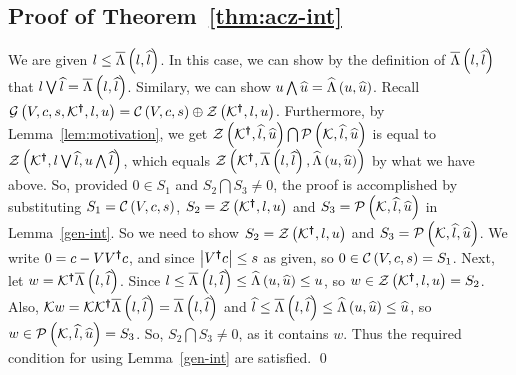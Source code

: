 \subsection*{Proof of Theorem~\ref{thm:acz-int}}
We are given $l\leq \overline{\Lambda}\left(l,\widehat{l}\right)$.  In this case, we can show
by the definition of $\overline{\Lambda}\left(l,\widehat{l}\right)$ that
$l\bigvee\widehat{l}=\overline{\Lambda}\left(l,\widehat{l}\right)$. Similary, we can show
$u\bigwedge \widehat{u}=\widehat{\Lambda}\left(u,\widehat{u}\right)$.  Recall
$\mathcal{G}\left(V,c,s,\mathcal{K}^{\bm{\dagger}},l,u\right)=\mathcal{C}\left(V,c,s\right)\oplus\mathcal{Z}\left(\mathcal{K}^{\bm{\dagger}},l,u\right)$.
Furthermore, by Lemma~\ref{lem:motivation}, we get
$\mathcal{Z}\left(\mathcal{K}^{\bm{\dagger}},\widehat{l},\widehat{u}\right)\bigcap\mathcal{P}\left(\mathcal{K},\widehat{l},\widehat{u}\right)$
is equal to
$\mathcal{Z}\left(\mathcal{K}^{\bm{\dagger}},l\bigvee\widehat{l},u\bigwedge{\widehat{l}}\right)$, which
equals
$\mathcal{Z}\left(\mathcal{K}^{\bm{\dagger}},\overline{\Lambda}\left(l,\widehat{l}\right),\widehat{\Lambda}\left(u,\widehat{u}\right)\right)$
by what we have above.  So, provided $0\in S_1$ and $S_2\bigcap
S_3\neq 0$, the proof is accomplished by substituting
$S_1=\mathcal{C}\left(V,c,s\right)$, $S_2=\mathcal{Z}\left(\mathcal{K}^{\bm{\dagger}},l,u\right)$ and
$S_3=\mathcal{P}\left(\mathcal{K},\widehat{l},\widehat{u}\right)$ in Lemma~\ref{gen-int}.  So
we need to show $S_2=\mathcal{Z}\left(\mathcal{K}^{\bm{\dagger}},l,u\right)$ and
$S_3=\mathcal{P}\left(\mathcal{K},\widehat{l},\widehat{u}\right)$.  We write $0 =
c-VV^{\bm{\dagger}}c$, and since $\left|V^{\bm{\dagger}}c\right|\leq s$ as given, so $0\in
\mathcal{C}\left(V,c,s\right)=S_1$.  Next, let
$w=\mathcal{K}^{\bm{\dagger}}\overline{\Lambda}\left(l,\widehat{l}\right)$.  Since $l\leq
\overline{\Lambda}\left(l,\widehat{l}\right)\leq \widehat{\Lambda}\left(u,\widehat{u}\right)\leq u$, so
$w\in\mathcal{Z}\left(\mathcal{K}^{\bm{\dagger}},l,u\right)= S_2$.  Also, $\mathcal{K}
w=\mathcal{K}\mathcal{K}^{\bm{\dagger}}\overline{\Lambda}\left(l,\widehat{l}\right) =
\overline{\Lambda}\left(l,\widehat{l}\right)$ and $\widehat{l}\leq \overline{\Lambda}\left(l,\widehat{l}\right)\leq
\widehat{\Lambda}\left(u,\widehat{u}\right)\leq \widehat{u}$, so $w\in
\mathcal{P}\left(\mathcal{K},\widehat{l},\widehat{u}\right)=S_3$.  So, $S_2\bigcap S_3\neq 0$,
as it contains $w$.  Thus the required condition for using
Lemma~\ref{gen-int} are satisfied. \qed


